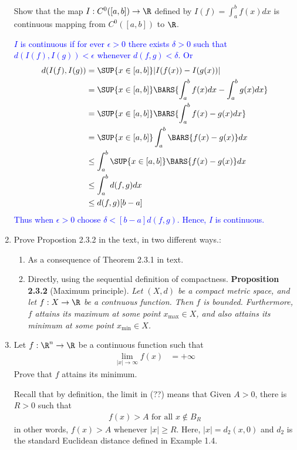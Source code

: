 \documentclass[10pt,a4paper]{report}
\newcommand{\BLUE}[1]{\textcolor{blue}{#1}}
\begin{document}
\begin{enumerate}[label=\Roman*.]
	Show that the map $I: C^0([a,b]) \to \R$ defined by $I(f)=\int_a^b f(x) dx$ is continuous mapping from $C^0([a,b])$ to $\R$.
	
	\BLUE{$I$ is continuous if for ever $\epsilon > 0$ there exists $\delta > 0$ such that $d(I(f),I(g))<\epsilon$ whenever $d(f,g) < \delta$. Or 
	\begin{align*}
		d(I(f),I(g)) &= \SUP{x\in [a,b]}|I(f(x))-I(g(x))|\\
			&= \SUP{x\in [a,b]}\BARS{\int_a^b f(x) dx-\int_a^b g(x) dx}\\
			&= \SUP{x\in [a,b]}\BARS{\int_a^b f(x) - g(x) dx}\\
			&= \SUP{x\in [a,b]}\int_a^b \BARS{f(x) - g(x)} dx\\
			&\le \int_a^b \SUP{x\in [a,b]}\BARS{f(x) - g(x)} dx\\
			&\le \int_a^b d(f,g) dx\\
			&\le d(f,g)[b-a]
	\end{align*}Thus when $\epsilon > 0$ choose $\delta < [b-a]d(f,g)$.  Hence, $I$ is continuous.
	}
	
	\item Prove Propostion 2.3.2 in the text, in two different ways.:
	\begin{enumerate}[label=\alph*)]
		\item As a consequence of Theorem 2.3.1 in text.
		\item Directly, using the sequential definition of compactness.
		\textbf{Proposition 2.3.2} (Maximum principle). \textit{ Let $(X,d)$ be a compact metric space, and let $f:X \to \R$ be a contnuous function.  Then $f$ is bounded.  Furthermore, $f$ attains its maximum at some point $x_{\max} \in X$, and also attains its minimum at some point $x_{\min} \in X$. }
	\end{enumerate}
	
	\item Let $f:\R^n \to \R$ be a continuous function such that 
	\begin{align*}
		\lim_{|x| \to \infty} f(x) &= + \infty
	\end{align*}Prove that $f$ attains its minimum.
	
	Recall that by definition, the limit in (??) means that Given $A > 0$, there is $R>0$ such that 
	\begin{align*}
		f(x) >A \text{    for all } x \not\in B_R
	\end{align*}in other words, $f(x) >A$ whenever $|x| \ge R$. Here, $|x| = d_2(x,0)$ and $d_2$ is the standard Euclidean distance defined in Example 1.4.
\end{enumerate}
\end{document}
